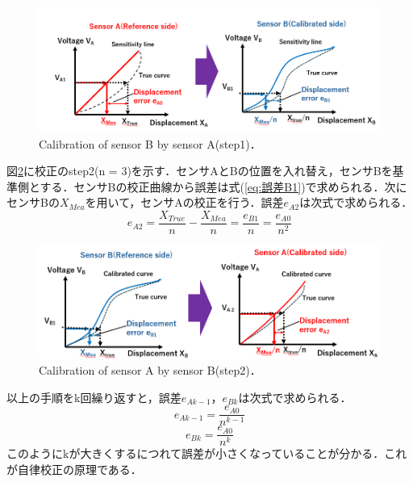 \begin{figure}[htbp]
    \centering %
    \includegraphics[width=120truemm,clip]{fig/fig_step1.png}
    \caption{Calibration of sensor B by sensor A(step1)．}
    \label{fig:step1}
\end{figure}
図\ref{fig:step2}に校正のstep2(n = 3)を示す．センサAとBの位置を入れ替え，センサBを基準側とする．センサBの校正曲線から誤差は式(\ref{eq:誤差B1})で求められる．次にセンサBの$X_{Mea}$を用いて，センサAの校正を行う．誤差$e_{A2}$は次式で求められる．
\begin{equation}
    e_{A2} = \frac{X_{True}}{n} - \frac{X_{Mea}}{n} = \frac{e_{B1}}{n} = \frac{e_{A0}}{n^2}
    \label{eq:誤差A2}
\end{equation}
\begin{figure}[htbp]
    \centering %
    \includegraphics[width=120truemm,clip]{fig/fig_step2.png}
    \caption{Calibration of sensor A by sensor B(step2)．}
    \label{fig:step2}
\end{figure}

以上の手順をk回繰り返すと，誤差$e_{Ak-1}$，$e_{Bk}$は次式で求められる．
\begin{equation}
    e_{Ak-1} = \frac{e_{A0}}{n^{k-1}}
    \label{eq:誤差Ak-1}
\end{equation}
\begin{equation}
    e_{Bk} = \frac{e_{A0}}{n^{k}}
    \label{eq:誤差Bk}
\end{equation}
このようにkが大きくするにつれて誤差が小さくなっていることが分かる．これが自律校正の原理である．